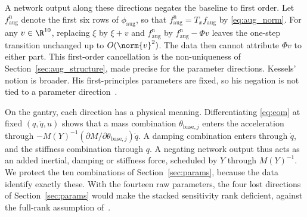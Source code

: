 A network output along these directions negates the baseline to first order.
Let $f^{\mathrm n}_{\mathrm{aug}}$ denote the first six rows of
$\phi_{\mathrm{aug}}$, so that $f^{\mathrm n}_{\mathrm{aug}}=T_xf_{\mathrm{aug}}$
by \eqref{eq:aug_norm}.
For any $v\in\R^{10}$, replacing $\xi$ by $\xi+v$ and
$f^{\mathrm n}_{\mathrm{aug}}$ by $f^{\mathrm n}_{\mathrm{aug}}-\Phi v$ leaves
the one-step transition unchanged up to $O(\norm{v}^2)$.
The data then cannot attribute $\Phi v$ to either part.
This first-order cancellation is the non-uniqueness of
Section~\ref{sec:aug_structure}, made precise for the parameter directions.
Kessels' notion is broader.
His first-principles parameters are fixed, so his negation is not tied to a
parameter direction~\cite[Eq.~(5.12)]{kessels2025ai}.

On the gantry, each direction has a physical meaning.
Differentiating \eqref{eq:eom} at fixed $(q,\dot q,u)$ shows that a mass
combination $\theta_{\mathrm{base},j}$ enters the acceleration through
$-M(Y)^{-1}(\partial M/\partial\theta_{\mathrm{base},j})\ddot q$.
A damping combination enters through $\dot q$, and the stiffness combination
through $q$.
A negating network output thus acts as an added inertial, damping or
stiffness force, scheduled by $Y$ through $M(Y)^{-1}$.
We protect the ten combinations of Section~\ref{sec:params}, because the
data identify exactly these.
With the fourteen raw parameters, the four lost directions of
Section~\ref{sec:params} would make the stacked sensitivity rank deficient,
against the full-rank assumption of~\cite[Assumption~1]{gyorok2026obc}.

